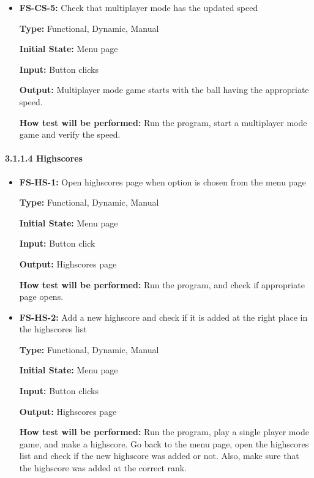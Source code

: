 \documentclass[12pt,letterpaper]{article}
\begin{document}
\begin{reqbox}
	\begin{itemize}
	\item \textbf{FS-CS-5: }Check that multiplayer mode has the updated speed

	\textbf{Type: }Functional, Dynamic, Manual

	\textbf{Initial State: }Menu page

	\textbf{Input: }Button clicks

	\textbf{Output: }Multiplayer mode game starts with the ball having the appropriate speed.

	\textbf{How test will be performed: }Run the program, start a multiplayer mode game and verify the speed.
	\end{itemize}
\end{reqbox}

	\paragraph{3.1.1.4 Highscores}
\begin{reqbox}
	\begin{itemize}
	\item \textbf{FS-HS-1: }Open highscores page when option is chosen from the menu page

	\textbf{Type: }Functional, Dynamic, Manual	

	\textbf{Initial State:} Menu page

	\textbf{Input: }Button click 

	\textbf{Output: }Highscores page

	\textbf{How test will be performed: }Run the program, and check if appropriate page opens.
	\end{itemize}
\end{reqbox}

\begin{reqbox}
	\begin{itemize}
	\item \textbf{FS-HS-2: }Add a new highscore and check if it is added at the right place in the highscores list

	\textbf{Type: }Functional, Dynamic, Manual

	\textbf{Initial State: }Menu page

	\textbf{Input: }Button clicks 

	\textbf{Output: }Highscores page

	\textbf{How test will be performed:} Run the program, play a single player mode game, and make a highscore. Go back to the menu page, open the highscores list and check if the new highscore was added or not. Also, make sure that the highscore was added at the correct rank.
	\end{itemize}
\end{reqbox}
\end{document}
